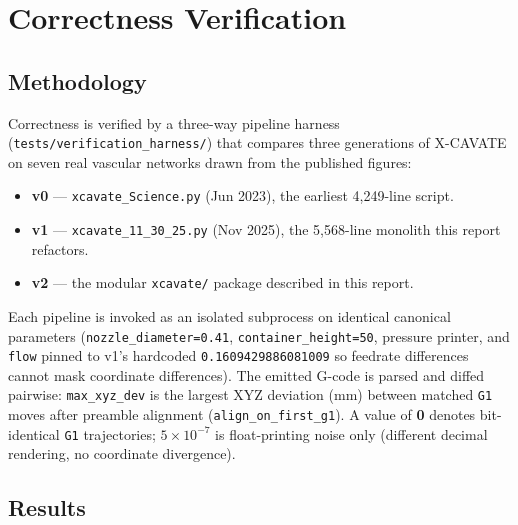 \documentclass[11pt,a4paper]{article}
\begin{document}
\section{Correctness Verification}

\subsection{Methodology}

Correctness is verified by a three-way pipeline harness
(\texttt{tests/verification\_harness/}) that compares three generations of
X-CAVATE on seven real vascular networks drawn from the published figures:

\begin{itemize}[leftmargin=2em]
    \item \textbf{v0} --- \texttt{xcavate\_Science.py} (Jun 2023), the earliest 4{,}249-line script.
    \item \textbf{v1} --- \texttt{xcavate\_11\_30\_25.py} (Nov 2025), the 5{,}568-line monolith this report refactors.
    \item \textbf{v2} --- the modular \texttt{xcavate/} package described in this report.
\end{itemize}

Each pipeline is invoked as an isolated subprocess on identical canonical
parameters (\texttt{nozzle\_diameter=0.41}, \texttt{container\_height=50},
pressure printer, and \texttt{flow} pinned to v1's hardcoded
\texttt{0.1609429886081009} so feedrate differences cannot mask coordinate
differences). The emitted G-code is parsed and diffed pairwise:
\texttt{max\_xyz\_dev} is the largest XYZ deviation (mm) between matched
\texttt{G1} moves after preamble alignment (\texttt{align\_on\_first\_g1}).
A value of \textbf{0} denotes bit-identical \texttt{G1} trajectories;
$5\times10^{-7}$ is float-printing noise only (different decimal rendering,
no coordinate divergence).

\subsection{Results}
\end{document}
